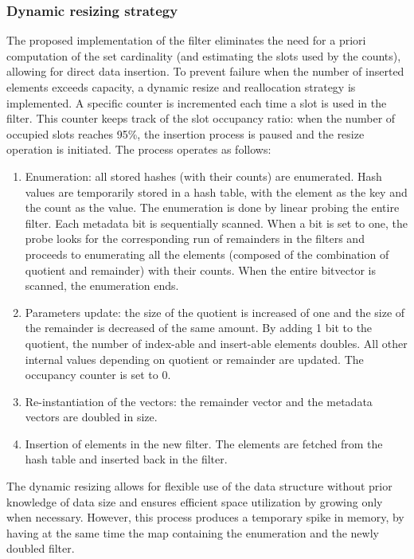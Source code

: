 \subsubsection{Dynamic resizing strategy}
The proposed implementation of the filter eliminates the need for a priori computation of the \kmer set cardinality (and estimating the slots used by the counts), allowing for direct data insertion. To prevent failure when the number of inserted elements exceeds capacity, a dynamic resize and reallocation strategy is implemented. A specific counter is incremented each time a slot is used in the filter. This counter keeps track of the slot occupancy ratio: when the number of occupied slots reaches 95\%, the insertion process is paused and the resize operation is initiated. The process operates as follows: 
\begin{enumerate}
	\item Enumeration: all stored hashes (with their counts) are enumerated. Hash values are temporarily stored in a hash table, with the element as the key and the count as the value. The enumeration is done by linear probing the entire filter. Each \occ metadata bit is sequentially scanned. When a bit is set to one, the probe looks for the corresponding run of remainders in the filters and proceeds to enumerating all the elements (composed of the combination of quotient and remainder) with their counts. When the entire \occs bitvector is scanned, the enumeration ends.
	\item Parameters update: the size of the quotient is increased of one and the size of the remainder is decreased of the same amount. By adding 1 bit to the quotient, the number of index-able and insert-able elements doubles. All other internal values depending on quotient or remainder are updated. The occupancy counter is set to 0.
	\item Re-instantiation of the vectors: the remainder vector and the metadata vectors are doubled in size.
	\item Insertion of elements in the new filter. The elements are fetched from the hash table and inserted back in the filter.
\end{enumerate}
The dynamic resizing allows for flexible use of the data structure without prior knowledge of data size and ensures efficient space utilization by growing only when necessary. However, this process produces a temporary spike in memory, by having at the same time the map containing the enumeration and the newly doubled filter.

